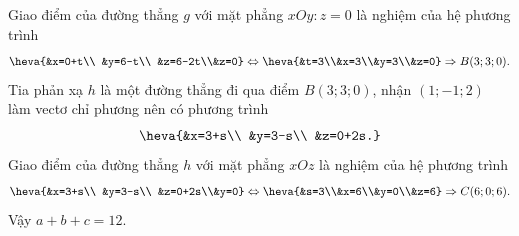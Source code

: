 \begin{bt}
{		Giao điểm của đường thẳng $g$ với mặt  phẳng $xOy\colon z=0$ là nghiệm của hệ phương trình \[\heva{&x=0+t\\ &y=6-t\\ &z=6-2t\\&z=0}\Leftrightarrow \heva{&t=3\\&x=3\\&y=3\\&z=0}\Rightarrow B(3;3;0).\]
		Tia phản xạ $h$ là một đường thẳng đi qua điểm $B(3;3;0)$, nhận $(1;-1;2)$ làm vectơ chỉ phương nên có phương trình \[\heva{&x=3+s\\  &y=3-s\\ &z=0+2s.}\]
		Giao điểm của đường thẳng $h$ với mặt phẳng $xOz$ là nghiệm của hệ phương trình \[\heva{&x=3+s\\  &y=3-s\\ &z=0+2s\\&y=0}\Leftrightarrow \heva{&s=3\\&x=6\\&y=0\\&z=6}\Rightarrow C(6;0;6).\]
		Vậy  $a+b+c=12$.
	} 
\end{bt}

